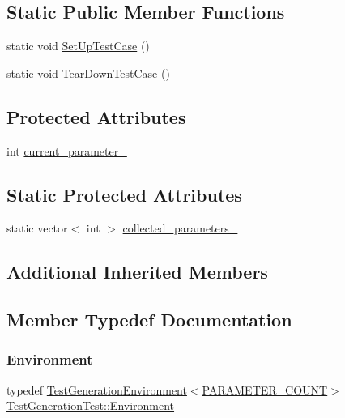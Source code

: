 \subsection*{Static Public Member Functions}
\begin{DoxyCompactItemize}
\item 
static void \mbox{\hyperlink{classTestGenerationTest_a3e1681e93e14b17fe923e763d88940cb}{Set\+Up\+Test\+Case}} ()
\item 
static void \mbox{\hyperlink{classTestGenerationTest_ab0f077f3b881d66e3676741761222732}{Tear\+Down\+Test\+Case}} ()
\end{DoxyCompactItemize}
\subsection*{Protected Attributes}
\begin{DoxyCompactItemize}
\item 
int \mbox{\hyperlink{classTestGenerationTest_a2d149b987b6dfe86ffbfae677199b0cd}{current\+\_\+parameter\+\_\+}}
\end{DoxyCompactItemize}
\subsection*{Static Protected Attributes}
\begin{DoxyCompactItemize}
\item 
static vector$<$ int $>$ \mbox{\hyperlink{classTestGenerationTest_a16dfa6f4b445c7e4a7a9611b34b7a7a2}{collected\+\_\+parameters\+\_\+}}
\end{DoxyCompactItemize}
\subsection*{Additional Inherited Members}


\subsection{Member Typedef Documentation}
\mbox{\label{classTestGenerationTest_aeff004d79bbb376d7acecd28f9fb71c6}} 
\subsubsection{\texorpdfstring{Environment}{Environment}}
{\footnotesize\ttfamily typedef \mbox{\hyperlink{classTestGenerationEnvironment}{Test\+Generation\+Environment}}$<$\mbox{\hyperlink{classTestGenerationTest_a42cdf2314eecc9a27690ee4a3da82a7fafd4242eef0a2666840480cf79613e7e1}{P\+A\+R\+A\+M\+E\+T\+E\+R\+\_\+\+C\+O\+U\+NT}}$>$ \mbox{\hyperlink{classTestGenerationTest_aeff004d79bbb376d7acecd28f9fb71c6}{Test\+Generation\+Test\+::\+Environment}}}



